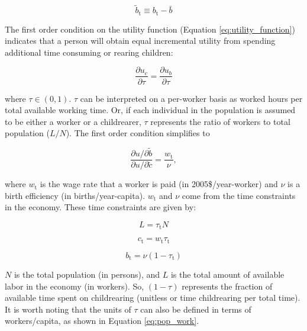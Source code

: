 \documentclass[letterpaper,12pt]{article}
\begin{document}
\begin{equation} \label{eq:b_tilde}
	\tilde b_\mathrm{t} \equiv b_\mathrm{t} - \bar b
\end{equation}

The first order condition on the utility function (Equation \ref{eq:utility_function}) indicates that a person will obtain equal incremental utility from spending additional time consuming or rearing children:

\begin{equation} \label{eq:first_order_condition_def}
	\frac{\partial u_{c}}{\partial \tau} = \frac{\partial u_{b}}{\partial \tau}
\end{equation}

\noindent where $\tau \in (0,1)$. $\tau$ can be interpreted on a per-worker basis as worked hours per total available working time. Or, if each individual in the population is assumed to be either a worker or a childrearer, $\tau$ represents the ratio of workers to total population ($L/N$). The first order condition simplifies to 

\begin{equation} \label{eq:first_order_condition_simplified}
	\frac{\partial u/ \partial\tilde b}{\partial u/ \partial\tilde c} = \frac{w_\mathrm{t}}{\nu},
\end{equation}

\noindent where $w_\mathrm{t}$ is the wage rate that a worker is paid (in 2005\$/year-worker) and $\nu$ is a birth efficiency (in births/year-capita). $w_\mathrm{t}$ and $\nu$ come from the time constraints in the economy. These time constraints are given by:

\begin{equation}\label{eq:pop_work}
	L = \tau_\mathrm{t} N
\end{equation}

\begin{equation} \label{eq:consumption_constraint}
	c_\mathrm{t} = w_\mathrm{t} \tau_\mathrm{t}
\end{equation}

\begin{equation} \label{eq:birth_constraint}
	b_\mathrm{t} = \nu (1-\tau_\mathrm{t})
\end{equation}

\noindent $N$ is the total population (in persons), and $L$ is the total amount of available labor in the economy (in workers). So, $(1-\tau)$ represents the fraction of available time spent on childrearing (unitless or time childrearing per total time). It is worth noting that the units of $\tau$ can also be defined in terms of workers/capita, as shown in Equation \ref{eq:pop_work}.
\end{document}
